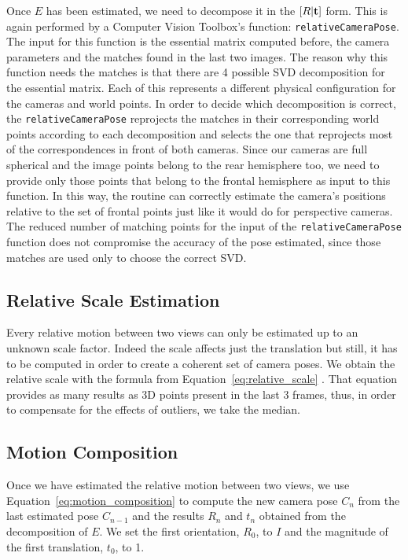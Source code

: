 Once $E$ has been estimated, we need to decompose it in the 
\( [R|\mathbf{t} ] \) form. This is again performed by a Computer Vision 
Toolbox's function: {\tt relativeCameraPose}.
The input for this function is the essential matrix computed before, the 
camera parameters and the matches found in the last two images.
The reason why this function needs the matches is that there are 4 possible 
SVD decomposition for the essential matrix. Each of this represents a 
different physical configuration for the cameras and world points.
In order to decide which decomposition is correct, the {\tt relativeCameraPose}
reprojects the matches in their corresponding world points according to each 
decomposition and selects the one that reprojects most of the correspondences in 
front of both cameras.
Since our cameras are full spherical and the image points belong to the 
rear hemisphere too, we need to provide only those points that belong to the 
frontal hemisphere as input to this function. In this way, the routine 
can correctly estimate the camera's positions relative to the set of frontal
points just like it would do for perspective cameras.
The reduced number of matching points for the input of the 
{\tt relativeCameraPose} function does not compromise the accuracy of the pose 
estimated, since those matches are used only to choose the 
correct SVD.

\subsection{Relative Scale Estimation}
Every relative motion between two views can only be estimated up to an unknown 
scale factor. Indeed the scale affects just the translation but still, it has to 
be computed in order to create a coherent set of camera poses.
We obtain the relative scale with the formula from 
Equation~\ref{eq:relative_scale} \cite{scaramuzzaVisualOdometryI}.
That equation provides as many results as 3D points present in the last 3 
frames, thus, in order to compensate for the effects of outliers, we take the 
median.

\subsection{Motion Composition}
Once we have estimated the relative motion between two views, we use 
Equation~\ref{eq:motion_composition} to compute the new camera pose $C_n$ from 
the last estimated pose $C_{n-1}$ and the results $R_{n}$ and $t_n$ obtained 
from the decomposition of $E$.
We set the first orientation, $R_0$, to $I$ and the magnitude of the first 
translation, $t_0$, to 1.


